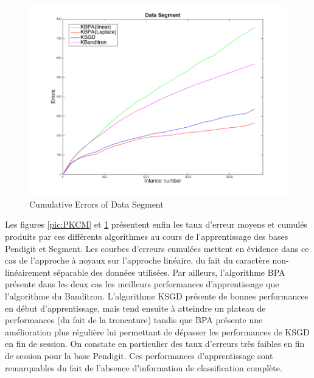 \documentclass[preprint,12pt,authoryear]{elsarticle}
\begin{document}
\begin{figure}[t!]
	\centerline{
		\includegraphics[width=\linewidth]{figs/Segment_kernel_CM.png}}
	\caption{Cumulative Errors of Data Segment}
	\label{pic:SKCM}
\end{figure}


Les figures  \ref{pic:PKCM} %
et \ref{pic:SKCM} 
présentent enfin les taux d'erreur moyens et cumulés produits par ces différents algorithmes au cours de l'apprentissage des bases Pendigit et Segment. Les courbes d'erreurs cumulées mettent en évidence dans ce cas de l'approche à noyaux sur l'approche linéaire, du fait du caractère non-linéairement séparable des données utilisées. Par ailleurs, l'algorithme BPA présente dans les deux cas les meilleurs performances d'apprentissage que l'algorithme du Banditron. L'algorithme KSGD présente de bonnes performances en début d'apprentissage, mais tend ensuite à atteindre un plateau de performances (du fait de la troncature) tandis que BPA présente une amélioration plus régulière lui permettant de dépasser les performances de KSGD en fin de session. On constate en particulier des taux d'erreurs très faibles en fin de session pour la base Pendigit. Ces performances d'apprentissage sont remarquables du fait de l'absence d'information de classification complète.  
\end{document}
